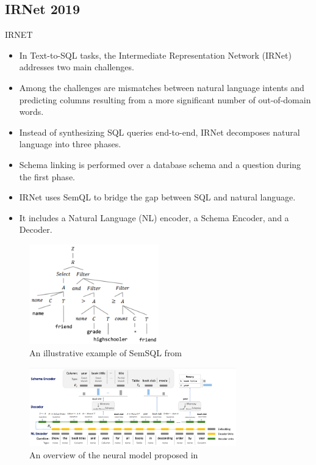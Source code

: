 \subsection{IRNet 2019}

IRNET \cite{DBLP:journals/corr/abs-1905-08205}

\begin{itemize}
    \item In Text-to-SQL tasks, the Intermediate Representation Network (IRNet) addresses two main challenges.
    \item Among the challenges are mismatches between natural language intents and predicting columns resulting from a more significant number of out-of-domain words.
    \item Instead of synthesizing SQL queries end-to-end, IRNet decomposes natural language into three phases.
    \item Schema linking is performed over a database schema and a question during the first phase.
    \item IRNet uses SemQL to bridge the gap between SQL and natural language.
    \item It includes a Natural Language (NL) encoder, a Schema Encoder, and a Decoder.
\end{itemize}

\begin{figure}[htb]
    \centering
    \includegraphics[width=0.5\textwidth]{pics/IRNet/illustrative_SemSQL}
    \caption{An illustrative example of SemSQL from \cite{DBLP:journals/corr/abs-1905-08205}}
    \label{fig:illustrative_SemSQL}
\end{figure}

\begin{figure}[htb]
    \centering
    \includegraphics[width=0.8\textwidth]{pics/IRNet/overview}
    \caption{An overview of the neural model proposed in \cite{DBLP:journals/corr/abs-1905-08205}}
    \label{fig:overview}
\end{figure}

